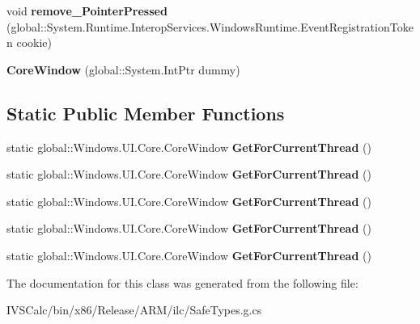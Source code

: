 \begin{DoxyCompactItemize}
\item 
\mbox{\label{class_windows_1_1_u_i_1_1_core_1_1_core_window_a96f250810201c484ac490b1bcc7659cf}} 
void {\bfseries remove\+\_\+\+Pointer\+Pressed} (global\+::\+System.\+Runtime.\+Interop\+Services.\+Windows\+Runtime.\+Event\+Registration\+Token cookie)
\item 
\mbox{\label{class_windows_1_1_u_i_1_1_core_1_1_core_window_a482951fd8b0eed511b43c092a3931985}} 
{\bfseries Core\+Window} (global\+::\+System.\+Int\+Ptr dummy)
\end{DoxyCompactItemize}
\subsection*{Static Public Member Functions}
\begin{DoxyCompactItemize}
\item 
\mbox{\label{class_windows_1_1_u_i_1_1_core_1_1_core_window_a952b7abcae83c6658e1416e574c31765}} 
static global\+::\+Windows.\+U\+I.\+Core.\+Core\+Window {\bfseries Get\+For\+Current\+Thread} ()
\item 
\mbox{\label{class_windows_1_1_u_i_1_1_core_1_1_core_window_a952b7abcae83c6658e1416e574c31765}} 
static global\+::\+Windows.\+U\+I.\+Core.\+Core\+Window {\bfseries Get\+For\+Current\+Thread} ()
\item 
\mbox{\label{class_windows_1_1_u_i_1_1_core_1_1_core_window_a952b7abcae83c6658e1416e574c31765}} 
static global\+::\+Windows.\+U\+I.\+Core.\+Core\+Window {\bfseries Get\+For\+Current\+Thread} ()
\item 
\mbox{\label{class_windows_1_1_u_i_1_1_core_1_1_core_window_a952b7abcae83c6658e1416e574c31765}} 
static global\+::\+Windows.\+U\+I.\+Core.\+Core\+Window {\bfseries Get\+For\+Current\+Thread} ()
\item 
\mbox{\label{class_windows_1_1_u_i_1_1_core_1_1_core_window_a952b7abcae83c6658e1416e574c31765}} 
static global\+::\+Windows.\+U\+I.\+Core.\+Core\+Window {\bfseries Get\+For\+Current\+Thread} ()
\end{DoxyCompactItemize}


The documentation for this class was generated from the following file\+:\begin{DoxyCompactItemize}
\item 
I\+V\+S\+Calc/bin/x86/\+Release/\+A\+R\+M/ilc/Safe\+Types.\+g.\+cs\end{DoxyCompactItemize}
